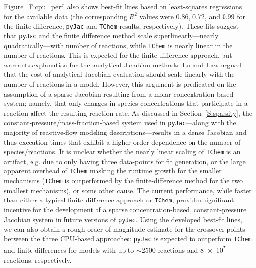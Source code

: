 \documentclass[preprint,12pt]{elsarticle}
\begin{document}
{Figure~\ref{F:cpu_perf} also shows best-fit lines based on least-squares regressions for the available data (the corresponding $R^2$ values were 0.86, 0.72, and 0.99 for the finite difference, \texttt{pyJac} and \texttt{TChem} results, respectively).
These fits suggest that \texttt{pyJac} and the finite difference method scale superlinearly---nearly quadratically---with number of reactions, while \texttt{TChem} is nearly linear in the number of reactions.
This is expected for the finite difference approach, but warrants explanation for the analytical Jacobian methods.
Lu and Law argued~\cite{Lu:2009gh} that the cost of analytical Jacobian evaluation should scale linearly with the number of reactions in a model.
However, this argument is predicated on the assumption of a sparse Jacobian resulting from a molar-concentration-based system; namely, that only changes in species concentrations that participate in a reaction affect the resulting reaction rate.
As discussed in Section~\ref{S:sparsity}, the constant-pressure\slash mass-fraction-based system used in \texttt{pyJac}---along with the majority of reactive-flow modeling descriptions---results in a dense Jacobian and thus execution times that exhibit a higher-order dependence on the number of species\slash reactions.
It is unclear whether the nearly linear scaling of \texttt{TChem} is an artifact, e.g. due to only having three data-points for fit generation, or the large apparent overhead of \texttt{TChem} masking the runtime growth for the smaller mechanisms (\texttt{TChem} is outperformed by the finite-difference method for the two smallest mechanisms), or some other cause.
The current performance, while faster than either a typical finite difference approach or \texttt{TChem}, provides significant incentive for the development of a sparse concentration-based, constant-pressure Jacobian system in future versions of \texttt{pyJac}.
Using the developed best-fit lines, we can also obtain a rough order-of-magnitude estimate for the crossover points between the three CPU-based approaches: \texttt{pyJac} is expected to outperform \texttt{TChem} and finite differences for models with up to $\sim$2500 reactions and \num{8e7} reactions, respectively.

}
\end{document}
